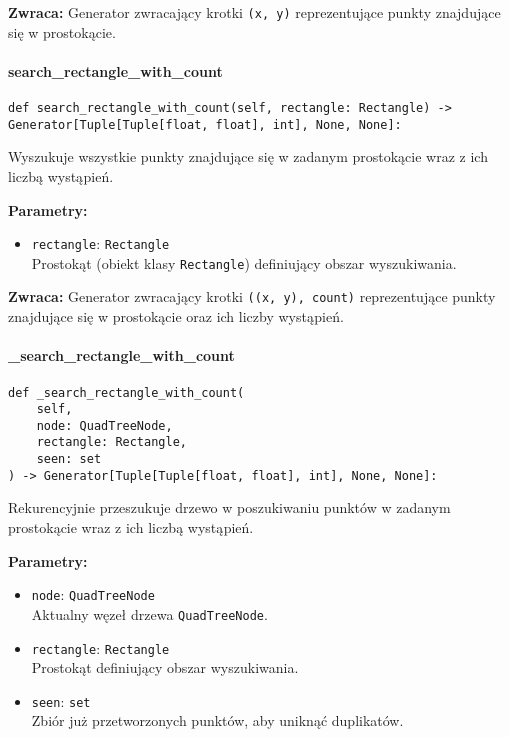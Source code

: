\documentclass[12pt]{article}
\begin{document}
\textbf{Zwraca:} 
Generator zwracający krotki \texttt{(x, y)} reprezentujące punkty znajdujące się w prostokącie.

\paragraph{search\_rectangle\_with\_count}

\begin{verbatim}
def search_rectangle_with_count(self, rectangle: Rectangle) -> Generator[Tuple[Tuple[float, float], int], None, None]:
\end{verbatim}

\noindent Wyszukuje wszystkie punkty znajdujące się w zadanym prostokącie wraz z ich liczbą wystąpień.

\noindent\textbf{Parametry:}
\begin{itemize}
    \item \texttt{rectangle}: \texttt{Rectangle} \\
    Prostokąt (obiekt klasy \texttt{Rectangle}) definiujący obszar wyszukiwania.
\end{itemize}

\textbf{Zwraca:} 
Generator zwracający krotki \texttt{((x, y), count)} reprezentujące punkty znajdujące się w prostokącie oraz ich liczby wystąpień.

\paragraph{\_search\_rectangle\_with\_count}

\begin{verbatim}
def _search_rectangle_with_count(
    self,
    node: QuadTreeNode,
    rectangle: Rectangle,
    seen: set
) -> Generator[Tuple[Tuple[float, float], int], None, None]:
\end{verbatim}

\noindent Rekurencyjnie przeszukuje drzewo w poszukiwaniu punktów w zadanym prostokącie wraz z ich liczbą wystąpień.

\noindent\textbf{Parametry:}
\begin{itemize}
    \item \texttt{node}: \texttt{QuadTreeNode} \\
    Aktualny węzeł drzewa \texttt{QuadTreeNode}.
    
    \item \texttt{rectangle}: \texttt{Rectangle} \\
    Prostokąt definiujący obszar wyszukiwania.
    
    \item \texttt{seen}: \texttt{set} \\
    Zbiór już przetworzonych punktów, aby uniknąć duplikatów.
\end{itemize}
\end{document}
